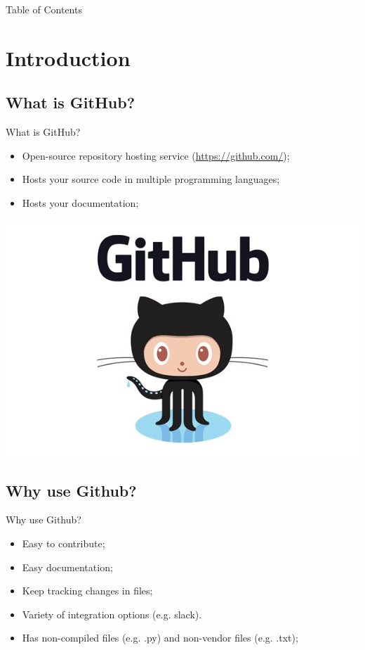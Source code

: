 \begin{noheadline}

\begin{frame}[allowframebreaks]{Table of Contents}

\tableofcontents

\end{frame}

\end{noheadline}


\section{Introduction}

\subsection{What is GitHub?}
\begin{frame}{What is GitHub?}
    \begin{itemize}

        \item Open-source repository hosting service (\href{https://github.com/}{https://github.com/});
        \item Hosts your source code in multiple programming languages;
        \item Hosts your documentation;        
    \end{itemize}
    \centering
    \includegraphics[scale=.3]{github}
\end{frame}

\subsection{Why use Github?}
\begin{frame}{Why use Github?}
\begin{itemize}
    \item Easy to contribute;
    \item Easy documentation;
    \item Keep tracking changes in files;
    \item Variety of integration options (e.g. slack).
    \item Has non-compiled files (e.g. .py) and non-vendor files (e.g. .txt);
\end{itemize}
\end{frame}

